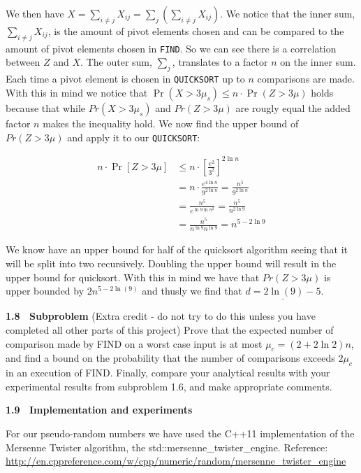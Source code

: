 \documentclass[article,a4paper,oneside]{article}
\newcommand{\+}[1]{\ensuremath{\boldsymbol{#1}}}
\begin{document}
We then have $X = \sum_{i \neq j} X_{ij} = \sum_j \left( \sum_{i \neq j} X_{ij} \right)$. We notice that the inner sum, $ \sum_{i \neq j} X_{ij}$, is the amount of pivot elements chosen and can be compared to the amount of pivot elements chosen in \texttt{FIND}. So we can see there is a correlation between $Z$ and $X$. The outer sum, $\sum_j$, translates to a factor $n$ on the inner sum. Each time a pivot element is chosen in \texttt{QUICKSORT} up to $n$ comparisons are made. With this in mind we notice that $\Pr(X>3\mu_s)\leq n\cdot\Pr(Z>3\mu)$ holds because that while $Pr(X > 3\mu_s)$ and $Pr(Z > 3\mu)$ are rougly equal the added factor $n$ makes the inequality hold. We now find the upper bound of $Pr(Z > 3\mu)$ and apply it to our \texttt{QUICKSORT}:

\begin{align*}
n\cdot \Pr[Z>3\mu] &\leq n\cdot \left [ \frac{e^2}{3^2} \right ]^{2\ln n}\\
&=n\cdot\frac{e^{4\ln n}}{9^{2\ln n}} =\frac{n^5}{9^{2\ln n}}\\
&=\frac{n^5}{e^{\ln 9 \ln n^2}} =\frac{n^5}{n^{2\ln 9}}\\
&=\frac{n^5}{n^{\ln 9}n^{\ln 9}} =n^{5-2\ln 9}
\end{align*}

We know have an upper bound for half of the quicksort algorithm seeing that it will be split into two recursively. Doubling the upper bound will result in the upper bound for quicksort. With this in mind we have that $Pr(Z > 3\mu)$ is upper bounded by $2n^{5-2\ln(9)}$ and thusly we find that $\underline{d = 2\ln(9) - 5}$.

{\bf 1.8 \ Subproblem} (Extra credit - do not try to do this unless
you have completed all other parts of this project) Prove
that the expected number of comparison made by FIND on a worst case
input is at most $\mu_c=(2+2\ln 2)n$, and find a bound on the
probability that the number of comparisons exceeds $2\mu_c$ in an
execution of FIND.  Finally, compare your analytical results with your
experimental results from subproblem 1.6, and make appropriate
comments.



{\bf 1.9 \ Implementation and experiments}

For our pseudo-random numbers we have used the C++11 implementation of the Mersenne Twister algorithm, the std::mersenne\_twister\_engine. Reference: \url{ http://en.cppreference.com/w/cpp/numeric/random/mersenne_twister_engine}

\end{document}

